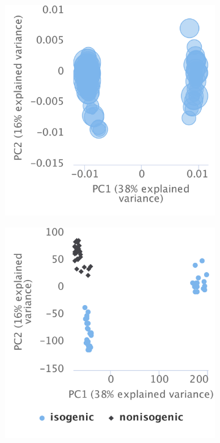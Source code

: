 \begin{figure}[!h]
\begin{subfigure}[h]{0.32\textwidth}
	\end{subfigure}
	\begin{subfigure}[h]{0.32\textwidth}
		\includegraphics[width=\textwidth]{images/psichomics/5-pca/c}
	\end{subfigure}
	\begin{subfigure}[h]{0.32\textwidth}
		\includegraphics[width=\textwidth]{images/psichomics/5-pca/d}

\end{subfigure}
\end{figure}
